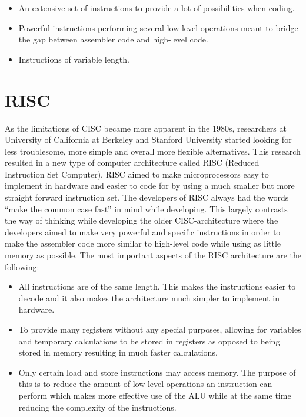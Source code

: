 \documentclass[11pt,twoside]{eitExjobb}
\begin{document}
\begin{itemize}
\item{An extensive set of instructions to provide a lot of possibilities when coding.}
\item{Powerful instructions performing several low level operations meant to bridge the gap between assembler code and high-level code.}
\item{Instructions of variable length.}
\end{itemize}

\section{RISC}
As the limitations of CISC became more apparent in the 1980s, researchers at University of California at Berkeley and Stanford University started looking for less troublesome, more simple and overall more flexible alternatives. This research resulted in a new type of computer architecture called RISC (Reduced Instruction Set Computer). RISC aimed to make microprocessors easy to implement in hardware and easier to code for by using a much smaller but more straight forward instruction set. The developers of RISC always had the words ``make the common case fast'' in mind while developing. This largely contrasts the way of thinking while developing the older CISC-architecture where the developers aimed to make very powerful and specific instructions in order to make the assembler code more similar to high-level code while using as little memory as possible. The most important aspects of the RISC architecture are the following:

\begin{itemize}
\item{All instructions are of the same length. This makes the instructions easier to decode and it also makes the architecture much simpler to implement in hardware.}
\item{To provide many registers without any special purposes, allowing for variables and temporary calculations to be stored in registers as opposed to being stored in memory resulting in much faster calculations.}
\item{Only certain load and store instructions may access memory. The purpose of this is to reduce the amount of low level operations an instruction can perform which makes more effective use of the ALU while at the same time reducing the complexity of the instructions.}
\end{itemize}
\end{document}
